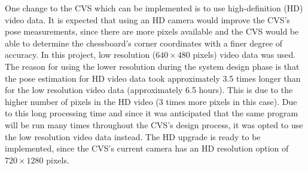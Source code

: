 One change to the CVS which can be implemented is to use high-definition (HD) video data. It is expected that using an HD camera would improve the CVS's pose measurements, since there are more pixels available and the CVS would be able to determine the chessboard's corner coordinates with a finer degree of accuracy. In this project, low resolution ($640\times480$ pixels) video data was used. The reason for using the lower resolution during the system design phase is that the pose estimation for HD video data took approximately 3.5 times longer than for the low resolution video data (approximately 6.5 hours). This is due to the higher number of pixels in the HD video (3 times more pixels in this case). Due to this long processing time and since it was anticipated that the same program will be run many times throughout the CVS's design process, it was opted to use the low resolution video data instead. The HD upgrade is ready to be implemented, since the CVS's current camera has an HD resolution option of $720\times1280$ pixels. 




